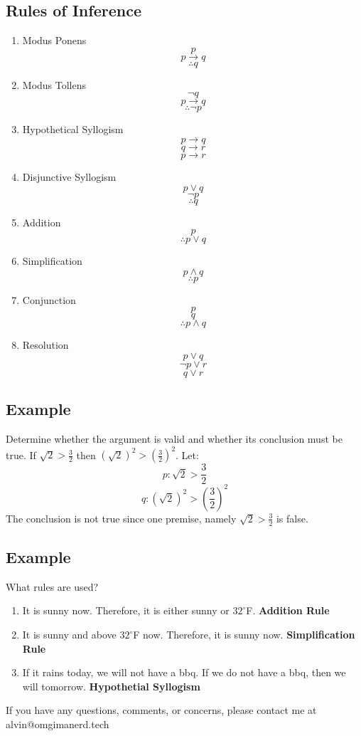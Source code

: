 \documentclass[letterpaper, 12pt]{math}
\begin{document}
\subsection*{Rules of Inference}
\begin{enumerate}
  \item Modus Ponens
    \[ p \]
    \[ p \to q \]
    \[ \therefore q\]
  \item Modus Tollens
    \[ \neg{q} \]
    \[ p \to q \]
    \[ \therefore \neg{p} \]
  \item Hypothetical Syllogism
    \[ p \to q \]
    \[ q \to r \]
    \[ p \to r \]
  \item Disjunctive Syllogism
    \[ p \vee q \]
    \[ \neg{p} \]
    \[ \therefore q \]
  \item Addition
    \[ p \]
    \[ \therefore p \vee q \]
  \item Simplification
    \[ p \wedge q \]
    \[ \therefore p \]
  \item Conjunction
    \[ p \]
    \[ q \]
    \[ \therefore p \wedge q \]
  \item Resolution
    \[ p \vee q \]
    \[ \neg{p} \vee r \]
    \[ q \vee r \]
\end{enumerate}

\subsection*{Example}
Determine whether the argument is valid and whether its conclusion must be true.
If \( \sqrt{2} > \frac{3}{2} \) then \( (\sqrt{2})^{2} > (\frac{3}{2})^{2} \).
Let:
\[ p: \sqrt{2} > \frac{3}{2} \]
\[ q: (\sqrt{2})^{2} > (\frac{3}{2})^{2} \]
The conclusion is not true since one premise, namely
\( \sqrt{2} > \frac{3}{2} \) is false.

\subsection*{Example}
What rules are used?
\begin{enumerate}
  \item It is sunny now. Therefore, it is either sunny or \( 32^{\circ} \)F.
    \textbf{Addition Rule}
  \item It is sunny and above \( 32^{\circ} \)F now. Therefore, it is sunny
    now. \textbf{Simplification Rule}
  \item If it rains today, we will not have a bbq. If we do not have a bbq,
    then we will tomorrow. \textbf{Hypothetial Syllogism}
\end{enumerate}

\begin{center}
  If you have any questions, comments, or concerns, please contact me at
  alvin@omgimanerd.tech
\end{center}
\end{document}
